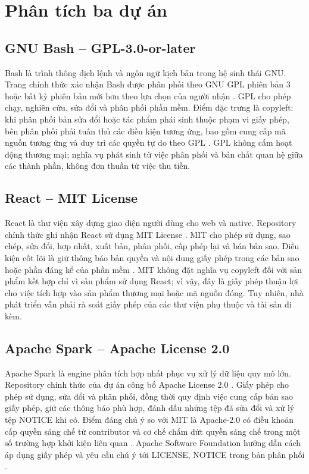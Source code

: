 \documentclass[12pt,a4paper]{article}
\begin{document}
\section{Phân tích ba dự án}
\subsection{GNU Bash -- GPL-3.0-or-later}
Bash là trình thông dịch lệnh và ngôn ngữ kịch bản trong hệ sinh thái GNU. Trang chính thức xác nhận Bash được phân phối theo GNU GPL phiên bản 3 hoặc bất kỳ phiên bản mới hơn theo lựa chọn của người nhận \cite{bash}. GPL cho phép chạy, nghiên cứu, sửa đổi và phân phối phần mềm. Điểm đặc trưng là copyleft: khi phân phối bản sửa đổi hoặc tác phẩm phái sinh thuộc phạm vi giấy phép, bên phân phối phải tuân thủ các điều kiện tương ứng, bao gồm cung cấp mã nguồn tương ứng và duy trì các quyền tự do theo GPL \cite{gpl,fsf}. GPL không cấm hoạt động thương mại; nghĩa vụ phát sinh từ việc phân phối và bản chất quan hệ giữa các thành phần, không đơn thuần từ việc thu tiền.

\subsection{React -- MIT License}
React là thư viện xây dựng giao diện người dùng cho web và native. Repository chính thức ghi nhận React sử dụng MIT License \cite{react}. MIT cho phép sử dụng, sao chép, sửa đổi, hợp nhất, xuất bản, phân phối, cấp phép lại và bán bản sao. Điều kiện cốt lõi là giữ thông báo bản quyền và nội dung giấy phép trong các bản sao hoặc phần đáng kể của phần mềm \cite{mit}. MIT không đặt nghĩa vụ copyleft đối với sản phẩm kết hợp chỉ vì sản phẩm sử dụng React; vì vậy, đây là giấy phép thuận lợi cho việc tích hợp vào sản phẩm thương mại hoặc mã nguồn đóng. Tuy nhiên, nhà phát triển vẫn phải rà soát giấy phép của các thư viện phụ thuộc và tài sản đi kèm.

\subsection{Apache Spark -- Apache License 2.0}
Apache Spark là engine phân tích hợp nhất phục vụ xử lý dữ liệu quy mô lớn. Repository chính thức của dự án công bố Apache License 2.0 \cite{spark}. Giấy phép cho phép sử dụng, sửa đổi và phân phối, đồng thời quy định việc cung cấp bản sao giấy phép, giữ các thông báo phù hợp, đánh dấu những tệp đã sửa đổi và xử lý tệp NOTICE khi có. Điểm đáng chú ý so với MIT là Apache-2.0 có điều khoản cấp quyền sáng chế từ contributor và cơ chế chấm dứt quyền sáng chế trong một số trường hợp khởi kiện liên quan \cite{apache,apachefaq}. Apache Software Foundation hướng dẫn cách áp dụng giấy phép và yêu cầu chú ý tới LICENSE, NOTICE trong bản phân phối \cite{applyapache}.
\end{document}
